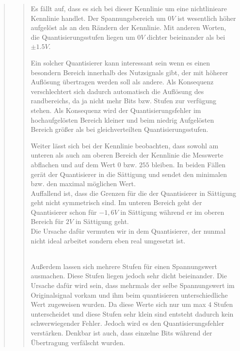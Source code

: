 \begin{quote}
\begin{quote}
        Es fällt auf, dass es sich bei dieser Kennlinie um eine nichtlinieare Kennlinie handlet. Der Spannungsbereich um
        $0V$ ist wesentlich höher aufgelöst als an den Rändern der Kennlinie. Mit anderen Worten, die
        Quantisierungsstufen liegen um $0V$ dichter beieinander als bei $\pm 1.5V$.\vspace{1em}
        
        Ein solcher Quantisierer kann interessant sein wenn es einen besondern Bereich innerhalb des Nutzsignals gibt,
        der mit höherer Auflösung übertragen werden soll als andere. Als Konsequenz verschlechtert sich dadurch
        automatisch die Auflösung des randbereichs, da ja nicht mehr Bits bzw. Stufen zur verfügung
        stehen. Als Konsequenz wird der Quantisierungsfehler im hochaufgelösten Bereich kleiner und beim
        niedrig Aufgelösten Bereich größer als bei gleichverteilten Quantisierungsstufen.\vspace{1em}
        
        Weiter lässt sich bei der Kennlinie beobachten, dass sowohl am unteren als auch am oberen Bereich der
        Kennlinie die Messwerte abflachen und auf dem Wert $0$ bzw. $255$ bleiben. In beiden Fällen gerät der
        Quantisierer in die Sättigung und sendet den minimalen bzw. den maximal möglichen Wert.\\
        Auffallend ist, dass die Grenzen für die der Quantisierer in Sättigung geht nicht symmetrisch sind. Im unteren
        Bereich geht der Quantisierer schon für $-1,6 V$ in Sättigung während er im oberen Bereich für $2 V$ in
        Sättigung geht.\\
        Die Ursache dafür vermuten wir in dem Quantisierer, der nunmal nicht ideal arbeitet sondern eben real umgesetzt
        ist.\vspace{1em}
        
         \\
        
        Außerdem lassen sich mehrere Stufen für einen Spannungswert ausmachen. Diese Stufen liegen jedoch sehr dicht
        beieinander. Die Ursache dafür wird sein, dass mehrmals der selbe Spannungswert im Originalsignal vorkam und
        ihm beim quantisieren unterschiedliche Wert zugeweisen wurden. Da diese Werte sich nur um max $4$ Stufen
        unterscheidet und diese Stufen sehr klein sind entsteht dadurch kein schwerwiegender Fehler. Jedoch wird es den
        Quantisierungsfehler verstärken. Denkbar ist auch, dass einzelne Bits während der Übertragung verfälscht
        wurden.\vspace{1em}
        

\end{quote}
\end{quote}
